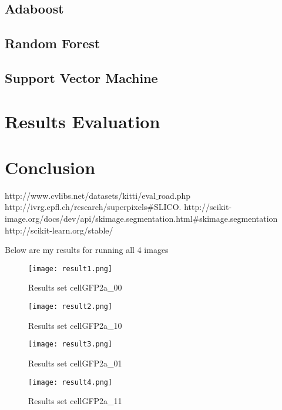 \documentclass[paper=letter, fontsize=11pt]{scrartcl}
\numberwithin{equation}{section}		%
\numberwithin{figure}{section}			%
\numberwithin{table}{section}				%
\begin{document}
\subsection{Adaboost}
\subsection{Random Forest}
\subsection{Support Vector Machine}

\section{Results Evaluation}

\section{Conclusion}

\begin{thebibliography}{9}

  http://www.cvlibs.net/datasets/kitti/eval$\_$road.php
  http://ivrg.epfl.ch/research/superpixels$\#$SLICO. 
  http://scikit-image.org/docs/dev/api/skimage.segmentation.html$\#$skimage.segmentation
  http://scikit-learn.org/stable/
\end{thebibliography}




\if

Below are my results for running all 4 images
\begin{figure}[H]
\begin{center}
\texttt{[image: result1.png]}
\end{center}
\caption{Results set cellGFP2a\_00}
\label{fig:resultset1}
\end{figure}
\begin{figure}[H]
\begin{center}
\texttt{[image: result2.png]}
\end{center}
\caption{Results set cellGFP2a\_10}
\label{fig:resultset2}
\end{figure}
\begin{figure}[H]
\begin{center}
\texttt{[image: result3.png]}
\end{center}
\caption{Results set cellGFP2a\_01}
\label{fig:resultset3}
\end{figure}
\begin{figure}[H]
\begin{center}
\texttt{[image: result4.png]}
\end{center}
\caption{Results set cellGFP2a\_11}
\label{fig:resultset4}
\end{figure}

\fi
\end{document}
